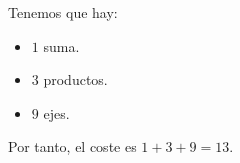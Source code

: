 \begin{ejercicio}
    Tenemos que hay:
    \begin{itemize}
        \item $1$ suma.
        \item $3$ productos.
        \item $9$ ejes.
    \end{itemize}

    Por tanto, el coste es $1+3+9=13$.
\end{ejercicio}


